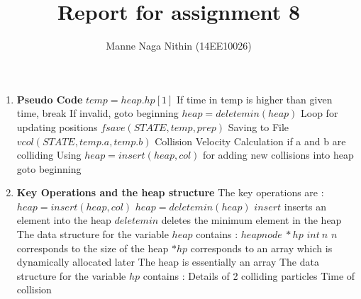 \documentclass[a4paper,11pt]{article}
\title{Report for assignment 8}
\author{Manne Naga Nithin (14EE10026)}
\begin{document}
\maketitle

\paragraph{}
\begin{enumerate}
 \item \textbf{Pseudo Code}\newline
 $temp=heap.hp[1]$\newline
 If time in temp is higher than given time, break\newline
 If invalid, goto beginning\newline
 $heap=deletemin(heap)$\newline
 Loop for updating positions\newline
 $fsave(STATE,temp,prep)$ Saving to File\newline
 $vcol(STATE,temp.a,temp.b)$ Collision Velocity Calculation if a and b are colliding\newline
 Using $heap=insert(heap,col)$ for adding new collisions into heap\newline
 goto beginning\newline
 
 \item \textbf{Key Operations and the heap structure}\newline
 The key operations are :\newline
 $heap=insert(heap,col)$\newline
 $heap=deletemin(heap)$\newline
 $insert$ inserts an element into the heap\newline
 $deletemin$ deletes the minimum element in the heap\newline
 The data structure for the variable $heap$ contains :\newline
 $heapnode\ *hp$\newline
 $int\ n$\newline
 $n$ corresponds to the size of the heap\newline
 $*hp$ corresponds to an array which is dynamically allocated later\newline
 The heap is essentially an array\newline
 The data structure for the variable $hp$ contains :\newline
 Details of 2 colliding particles\newline
 Time of collision\newline
 

\end{enumerate}
\end{document}
